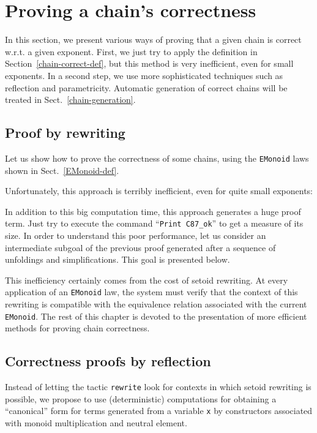 
 \section{Proving a chain's correctness}
\label{chain-correctness-sect}
In this section, we present various ways of proving that a given chain is 
correct w.r.t. a given exponent. First, we just try to apply 
the definition in Section~\vref{chain-correct-def}, but this method is very 
inefficient, even for small exponents. In a second step, we use more sophisticated techniques such as reflection and parametricity. Automatic generation of correct chains will be treated in Sect.~\vref{chain-generation}.

\subsection{Proof by rewriting}
Let us show how to prove  the correctness of some chains, using
the \texttt{EMonoid} laws shown in Sect.~\vref{EMonoid-def}. 


Unfortunately, this approach is terribly inefficient, even for quite small exponents:


In addition to this big computation time, this approach 
generates a huge proof term. Just try to execute the command 
``\texttt{Print C87\_ok}'' to get a measure of its size.
In order to understand this poor performance, let us consider an intermediate
subgoal of the previous proof generated after a sequence of unfoldings and simplifications. This goal is presented below.



This inefficiency certainly comes from the cost of setoid rewriting.
At every application of an \texttt{EMonoid} law, the system must
verify that the context of this rewriting is compatible  with the equivalence
relation associated with the current \texttt{EMonoid}.
The rest of this chapter is devoted to the  presentation of more efficient 
 methods for proving chain correctness.
 

\subsection{Correctness proofs by reflection}
\label{reflection-section}
Instead of letting the tactic \texttt{rewrite} look for contexts in which
setoid rewriting is possible, we propose to use (deterministic) computations for
obtaining a ``canonical'' form for terms generated from a variable \texttt{x}
by constructors associated with monoid multiplication and neutral element.

